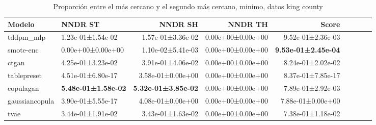 \begin{table}[H]
\centering
\fontsize{10}{14}\selectfont
\caption{Proporción entre el más cercano y el segundo más cercano, minimo, datos king county}
\label{table-dcr-king county-a}
\begin{tabular}{|l|l|r|r|r|r|r|r|r|}
\hline
\rowcolor[gray]{0.8}
Modelo & NNDR ST & NNDR SH & NNDR TH & \textbf{Score} \\
\hline tddpm\_mlp & 1.23e-01±1.54e-02 & 1.57e-01±3.36e-02 & 0.00e+00±0.00e+00 & 9.52e-01±2.36e-03 \\
\hline smote-enc & \cellcolor[rgb]{0.9, 0.54, 0.52} 0.00e+00±0.00e+00 & \cellcolor[rgb]{0.9, 0.54, 0.52} 1.10e-02±5.41e-03 & 0.00e+00±0.00e+00 & \bfseries 9.53e-01±2.45e-04 \\
\hline ctgan & 4.25e-01±3.23e-02 & 3.91e-01±4.06e-02 & 0.00e+00±0.00e+00 & 8.24e-01±2.02e-02 \\
\hline tablepreset & 4.51e-01±6.80e-17 & 3.58e-01±0.00e+00 & 0.00e+00±0.00e+00 & 8.37e-01±7.85e-17 \\
\hline copulagan & \bfseries 5.48e-01±1.58e-02 & \bfseries 5.32e-01±3.85e-02 & 0.00e+00±0.00e+00 & 7.89e-01±2.92e-03 \\
\hline gaussiancopula & 3.90e-01±5.55e-17 & 4.08e-01±0.00e+00 & 0.00e+00±0.00e+00 & 7.88e-01±0.00e+00 \\
\hline tvae & 3.44e-01±1.91e-02 & 3.43e-01±1.63e-02 & 0.00e+00±0.00e+00 & \cellcolor[rgb]{0.9, 0.54, 0.52} 7.38e-01±1.18e-02 \\
\hline
\end{tabular}
\end{table}
